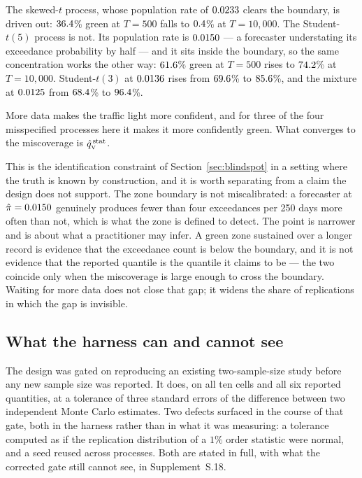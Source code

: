 The skewed-$t$ process, whose population rate of $0.0233$ clears the boundary, is
driven out: $36.4$\% green at $T = 500$ falls to $0.4$\% at $T = 10{,}000$. The
Student-$t(5)$ process is not. Its population rate is $0.0150$ --- a forecaster
understating its exceedance probability by half --- and it sits inside the
boundary, so the same concentration works the other way: $61.6$\% green at $T = 500$ rises to $74.2$\% at $T = 10{,}000$. Student-$t(3)$ at $0.0136$ rises from $69.6$\% to $85.6$\%, and the mixture at $0.0125$ from $68.4$\% to $96.4$\%.

More data makes the traffic light more confident, and for three of the four
misspecified processes here it makes it more confidently green. What converges to
the miscoverage is $\hat{q}_{\scriptscriptstyle\mathrm{V}}^{\,\mathrm{stat}}$.

This is the identification constraint of Section~\ref{sec:blindspot} in a setting
where the truth is known by construction, and it is worth separating from a claim
the design does not support. The zone boundary is not miscalibrated: a forecaster at $\hat\pi = 0.0150$ genuinely produces fewer than four exceedances per
250 days more often than not, which is what the zone is defined to detect. The
point is narrower and is about what a practitioner may infer. A green zone
sustained over a longer record is evidence that the exceedance count is below the
boundary, and it is not evidence that the reported quantile is the quantile it
claims to be --- the two coincide only when the miscoverage is large enough to
cross the boundary. Waiting for more data does not close that gap; it widens the
share of replications in which the gap is invisible.

\subsection{What the harness can and cannot see}
\label{sec:mc_harness}

The design was gated on reproducing an existing two-sample-size study before any
new sample size was reported. It does, on all ten cells and all six reported
quantities, at a tolerance of three standard errors of the difference between two
independent Monte Carlo estimates. Two defects surfaced in the course of that
gate, both in the harness rather than in what it was measuring: a tolerance
computed as if the replication distribution of a $1\%$ order statistic were
normal, and a seed reused across processes. Both are stated in full, with what
the corrected gate still cannot see, in Supplement~S.18.
